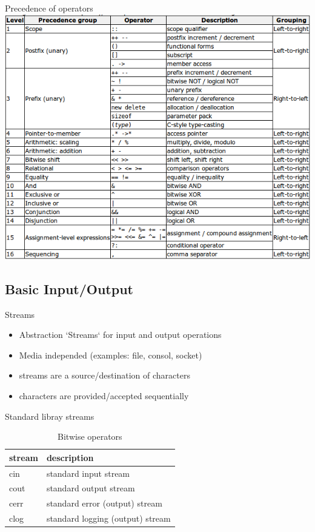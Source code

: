 \documentclass{beamer}
\begin{document}
\begin{frame}{Precedence of operators}
\includegraphics[scale=0.48]{img/OperatorPrecedence.png}
\end{frame}


\subsection{Basic Input/Output}

\begin{frame}{Streams}
\begin{itemize}
\item Abstraction `Streams` for input and output operations
\item Media independed (examples: file, consol, socket)
\item streams are a source/destination of characters
\item characters are provided/accepted sequentially
\end{itemize}
\end{frame}

\begin{frame}{Standard libray streams}
\begin{table}
\begin{tabular}{l | l}
stream & description \\
\hline
cin & standard input stream \\
cout & standard output stream \\
cerr & standard error (output) stream \\
clog & standard logging (output) stream \\
\end{tabular}
\caption{Bitwise operators}
\end{table}
\end{frame}
\end{document}
